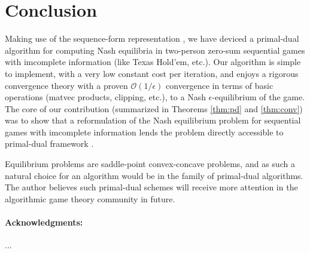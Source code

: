 \documentclass[12pt]{article}
\begin{document}
\section{Conclusion}
Making use of the sequence-form representation \cite{koller1992complexity, von1996efficient, vonequilibrium}, we have deviced a primal-dual algorithm for computing Nash equilibria in two-person zero-sum sequential games with imcomplete information (like Texas Hold'em, etc.). Our algorithm is simple to implement, with a very low constant cost per iteration, and enjoys a rigorous convergence theory with a proven $\mathcal{O}(1/\epsilon)$ convergence in terms of basic operations (matvec products, clipping, etc.), to a Nash $\epsilon$-equilibrium of the game. The core of our contribution (summarized in Theorems \ref{thm:pd} and \ref{thm:conv}) was to show that a reformulation of the Nash equilibrium problem for sequential games with imcomplete information lends the problem directly accessible to primal-dual framework \cite{chambolle2010, chambolle2014ergodic}.

Equilibrium problems are saddle-point convex-concave problems, and as such a natural choice for an algorithm would be in the family of primal-dual algorithms. The author believes such primal-dual schemes will receive more attention in the algorithmic game theory community in future.

\medskip \noindent

\paragraph{Acknowledgments:} ...
\small

% 

\end{document}
